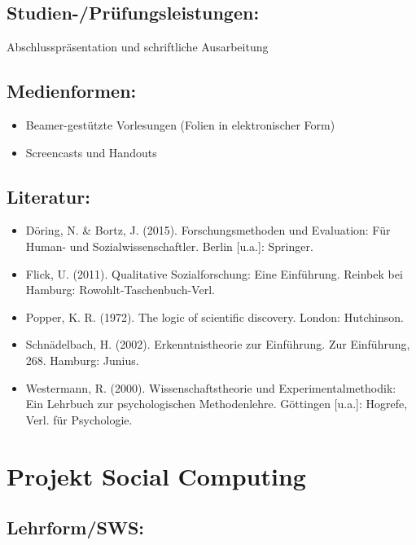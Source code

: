 \section*{Studien-/Prüfungsleistungen:}\label{studien-pruxfcfungsleistungen-16}

Abschlusspräsentation und schriftliche Ausarbeitung

\section*{Medienformen:}\label{medienformen-10}

\begin{itemize}
\item
  Beamer-gestützte Vorlesungen (Folien in elektronischer Form)
\item
  Screencasts und Handouts
\end{itemize}

\section*{Literatur:}\label{literatur-17}

\begin{itemize}
\item
  Döring, N. \& Bortz, J. (2015). Forschungsmethoden und Evaluation: Für
  Human- und Sozialwissenschaftler. Berlin {[}u.a.{]}: Springer.
\item
  Flick, U. (2011). Qualitative Sozialforschung: Eine Einführung.
  Reinbek bei Hamburg: Rowohlt-Taschenbuch-Verl.
\item
  Popper, K. R. (1972). The logic of scientific discovery. London:
  Hutchinson.
\item
  Schnädelbach, H. (2002). Erkenntnistheorie zur Einführung. Zur
  Einführung, 268. Hamburg: Junius.
\item
  Westermann, R. (2000). Wissenschaftstheorie und Experimentalmethodik:
  Ein Lehrbuch zur psychologischen Methodenlehre. Göttingen {[}u.a.{]}:
  Hogrefe, Verl. für Psychologie.
\end{itemize}

\chapter{Projekt Social Computing}\label{projekt-social-computing}

\section*{Lehrform/SWS:}\label{lehrformsws-18}


